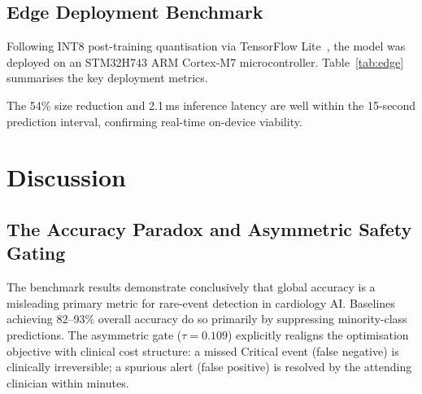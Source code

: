 \documentclass[conference]{IEEEtran}
\begin{document}
\subsection{Edge Deployment Benchmark}
Following INT8 post-training quantisation via TensorFlow Lite~\cite{b28},
the model was deployed on an STM32H743 ARM Cortex-M7
microcontroller.  Table~\ref{tab:edge} summarises the key deployment
metrics.

\begin{table}[h]
\caption{Edge Deployment Benchmark: ARM Cortex-M7 (STM32H743)}
\label{tab:edge}
\centering
{}
\end{table}

The 54\% size reduction and 2.1\,ms inference latency are well within
the 15-second prediction interval, confirming real-time on-device
viability.

\section{Discussion}

\subsection{The Accuracy Paradox and Asymmetric Safety Gating}
The benchmark results demonstrate conclusively that global accuracy is
a misleading primary metric for rare-event detection in cardiology AI.
Baselines achieving 82--93\% overall accuracy do so primarily by
suppressing minority-class predictions.  The asymmetric gate
($\tau = 0.109$) explicitly realigns the optimisation objective with
clinical cost structure: a missed Critical event (false negative) is
clinically irreversible; a spurious alert (false positive) is resolved
by the attending clinician within minutes.
\end{document}
